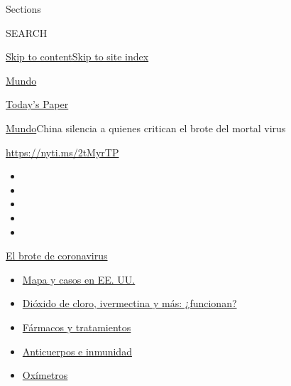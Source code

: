 Sections

SEARCH

\protect\hyperlink{site-content}{Skip to
content}\protect\hyperlink{site-index}{Skip to site index}

\href{https://www.nytimes.com/es/section/mundo}{Mundo}

\href{https://myaccount.nytimes.com/auth/login?response_type=cookie\&client_id=vi}{}

\href{https://www.nytimes.com/section/todayspaper}{Today's Paper}

\href{/es/section/mundo}{Mundo}\textbar{}China silencia a quienes
critican el brote del mortal virus

\url{https://nyti.ms/2tMyrTP}

\begin{itemize}
\item
\item
\item
\item
\item
\end{itemize}

\href{https://www.nytimes.com/es/spotlight/coronavirus?action=click\&pgtype=Article\&state=default\&region=TOP_BANNER\&context=storylines_menu}{El
brote de coronavirus}

\begin{itemize}
\tightlist
\item
  \href{https://www.nytimes.com/es/interactive/2020/espanol/mundo/coronavirus-en-estados-unidos.html?action=click\&pgtype=Article\&state=default\&region=TOP_BANNER\&context=storylines_menu}{Mapa
  y casos en EE. UU.}
\item
  \href{https://www.nytimes.com/es/2020/07/23/espanol/america-latina/bolivia-cloro-coronavirus-ivermectina.html?action=click\&pgtype=Article\&state=default\&region=TOP_BANNER\&context=storylines_menu}{Dióxido
  de cloro, ivermectina y más: ¿funcionan?}
\item
  \href{https://www.nytimes.com/es/interactive/2020/science/coronavirus-tratamientos-curas.html?action=click\&pgtype=Article\&state=default\&region=TOP_BANNER\&context=storylines_menu}{Fármacos
  y tratamientos}
\item
  \href{https://www.nytimes.com/es/2020/07/28/espanol/ciencia-y-tecnologia/anticuerpos-coronavirus-inmunidad.html?action=click\&pgtype=Article\&state=default\&region=TOP_BANNER\&context=storylines_menu}{Anticuerpos
  e inmunidad}
\item
  \href{https://www.nytimes.com/es/2020/04/29/espanol/estilos-de-vida/oximetro-para-que-sirve.html?action=click\&pgtype=Article\&state=default\&region=TOP_BANNER\&context=storylines_menu}{Oxímetros}
\end{itemize}

